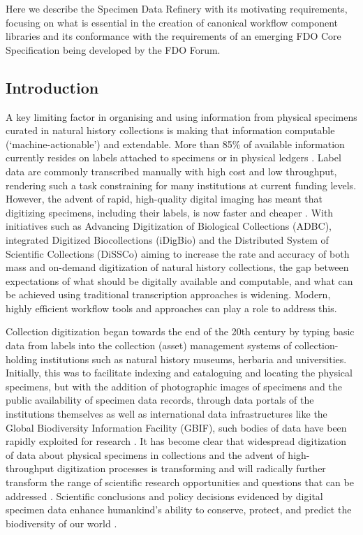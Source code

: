 Here we describe the Specimen Data Refinery with its motivating
requirements, focusing on what is essential in the creation of canonical
workflow component libraries and its conformance with the requirements
of an emerging FDO Core Specification being developed by the FDO Forum.

\hypertarget{introduction-2}{%
\subsection{Introduction}\label{introduction-2}}

A key limiting factor in organising and using information from physical
specimens curated in natural history collections is making that
information computable (`machine-actionable') and extendable. More than
85\% of available information currently resides on labels attached to
specimens or in physical ledgers \cite{Walton 2020}. Label data are commonly
transcribed manually with high cost and low throughput, rendering such a
task constraining for many institutions at current funding levels.
However, the advent of rapid, high-quality digital imaging has meant
that digitizing specimens, including their labels, is now faster and
cheaper \cite{ch8-2}. With initiatives such as Advancing Digitization of
Biological Collections (ADBC), integrated Digitized Biocollections
(iDigBio) and the Distributed System of Scientific Collections (DiSSCo)
\cite{ch8-3,ch8-4,ch8-5,ch8-6} aiming to increase the rate and accuracy of both mass and
on-demand digitization of natural history collections, the gap between
expectations of what should be digitally available and computable, and
what can be achieved using traditional transcription approaches is
widening. Modern, highly efficient workflow tools and approaches can
play a role to address this.

Collection digitization began towards the end of the 20th century by
typing basic data from labels into the collection (asset) management
systems of collection-holding institutions such as natural history
museums, herbaria and universities. Initially, this was to facilitate
indexing and cataloguing and locating the physical specimens, but with
the addition of photographic images of specimens and the public
availability of specimen data records, through data portals of the
institutions themselves as well as international data infrastructures
like the Global Biodiversity Information Facility (GBIF), such bodies of
data have been rapidly exploited for research \cite{ch8-7,ch8-8}. It has become
clear that widespread digitization of data about physical specimens in
collections and the advent of high-throughput digitization processes
\cite{ch8-9,ch8-10,ch8-11,ch8-12,ch8-13} is transforming and will radically further transform the
range of scientific research opportunities and questions that can be
addressed \cite{ch8-14,ch8-15}. Scientific conclusions and policy decisions
evidenced by digital specimen data enhance humankind's ability to
conserve, protect, and predict the biodiversity of our world
\cite{ch8-16,ch8-17}.

